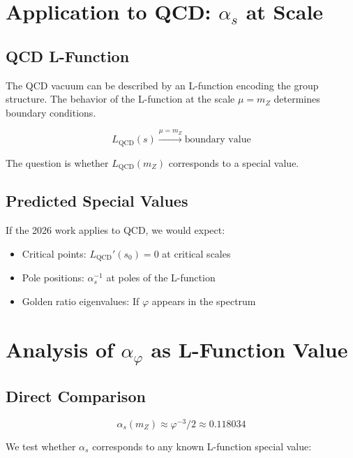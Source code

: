 \documentclass{article}
\begin{document}
\begin{table}[h]
\section{Application to QCD: $\alpha_s$ at Scale}

\subsection{QCD L-Function}

The QCD vacuum can be described by an L-function encoding the group structure. The behavior of the L-function at the scale $\mu = m_Z$ determines boundary conditions.

\begin{equation}
  L_{\text{QCD}}(s) \xrightarrow{\mu = m_Z} \text{boundary value}
  \label{eq:l-qcd-at-mz}
\end{equation}

The question is whether $L_{\text{QCD}}(m_Z)$ corresponds to a special value.

\subsection{Predicted Special Values}

If the 2026 work applies to QCD, we would expect:

\begin{itemize}
  \item Critical points: $L_{\text{QCD}}'(s_0) = 0$ at critical scales
  \item Pole positions: $\alpha_s^{-1}$ at poles of the L-function
  \item Golden ratio eigenvalues: If $\varphi$ appears in the spectrum
\end{itemize}

\section{Analysis of $\alpha_\varphi$ as L-Function Value}

\subsection{Direct Comparison}

\begin{equation}
  \alpha_s(m_Z) \approx \varphi^{-3}/2 \approx 0.118034
  \label{eq:target-alpha}
\end{equation}

We test whether $\alpha_s$ corresponds to any known L-function special value:


\end{table}
\end{document}
